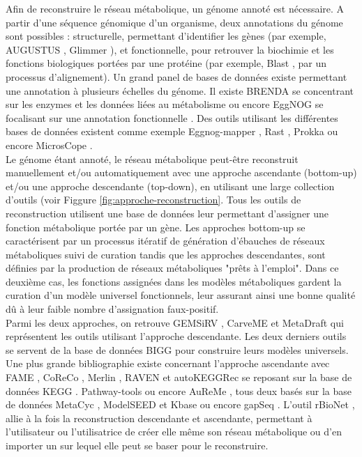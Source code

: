 \documentclass[../main.tex]{subfiles}
\begin{document}
Afin de reconstruire le réseau métabolique, un génome annoté est nécessaire. A partir d'une séquence génomique d'un organisme, deux annotations du génome sont possibles \citep{Médigue2002} : structurelle, permettant d'identifier les gènes (par exemple, AUGUSTUS \citep{Nachtweide2019}, Glimmer \citep{Delcher2007}), et  fonctionnelle, pour retrouver la biochimie et les fonctions biologiques portées par une protéine (par exemple, Blast \citep{Altschul1990}, par un processus d'alignement). Un grand panel de bases de données existe permettant une annotation à plusieurs échelles du génome. Il existe BRENDA \citep{Chang2021} se concentrant sur les enzymes et les données liées au métabolisme ou encore EggNOG se focalisant sur une annotation fonctionnelle \cite{Huerta-Cepas2019}. Des outils utilisant les différentes bases de données existent comme exemple Eggnog-mapper \citep{Cantalapiedra2021}, Rast \citep{Aziz2008}, Prokka \citep{Seemann2014} ou encore MicrosCope \citep{Vallenet2020} .\\


Le génome étant annoté, le réseau métabolique peut-être reconstruit manuellement et/ou automatiquement avec une approche ascendante (bottom-up) et/ou une approche descendante (top-down), en utilisant une large collection d'outils \citep{Mendoza2019} (voir Figgure \ref{fig:approche-reconstruction}. Tous les outils de reconstruction utilisent une base de données leur permettant d'assigner une fonction métabolique portée par un gène. Les approches bottom-up se caractérisent par un processus itératif de génération d'ébauches de réseaux métaboliques suivi de curation tandis que les approches descendantes, sont définies par la production de réseaux métaboliques "prêts à l'emploi". Dans ce deuxième cas, les fonctions assignées dans les modèles métaboliques gardent la curation d'un modèle universel fonctionnels, leur assurant ainsi une bonne qualité dû à leur faible nombre d'assignation faux-positif. \\


Parmi les deux approches, on retrouve GEMSiRV \citep{Liao2012}, CarveME \citep{Machado2018} et MetaDraft \citep{olivier2018} qui représentent les outils utilisant l'approche descendante. Les deux derniers outils se servent de la base de données BIGG \citep{King2016} pour construire leurs modèles universels. Une plus grande bibliographie existe concernant l'approche ascendante avec FAME \citep{Boele2012}, CoReCo \citep{Pitkanen2014}, Merlin \citep{Dias2015}, RAVEN \citep{Wang2018} et autoKEGGRec \citep{Karlsen2018} se reposant sur la base de données KEGG \citep{Kanehisa}. Pathway-tools \citep{Karp2022} ou encore AuReMe \citep{Aite2018}, tous deux basés sur la base de données MetaCyc \citep{Caspi2018}, ModelSEED \citep{Seaver2021} et Kbase \citep{Arkin2018} ou encore gapSeq \citep{Zimmermann2021}. L'outil rBioNet \citep{Thorleifsson2011}, allie à la fois la reconstruction descendante et ascendante, permettant à l'utilisateur ou l'utilisatrice de créer elle même son réseau métabolique ou d'en importer un sur lequel elle peut se baser pour le reconstruire. \\
\end{document}
